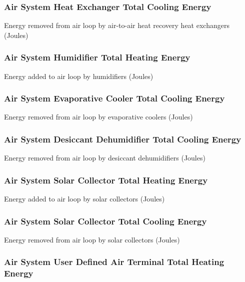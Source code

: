\subsubsection{Air System Heat Exchanger Total Cooling Energy}\label{air-system-heat-exchanger-total-cooling-energy}

Energy removed from air loop by air-to-air heat recovery heat exchangers (Joules)

\subsubsection{Air System Humidifier Total Heating Energy}\label{air-system-humidifier-total-heating-energy}

Energy added to air loop by humidifiers (Joules)

\subsubsection{Air System Evaporative Cooler Total Cooling Energy}\label{air-system-evaporative-cooler-total-cooling-energy}

Energy removed from air loop by evaporative coolers (Joules)

\subsubsection{Air System Desiccant Dehumidifier Total Cooling Energy}\label{air-system-desiccant-dehumidifier-total-cooling-energy}

Energy removed from air loop by desiccant dehumidifiers (Joules)

\subsubsection{Air System Solar Collector Total Heating Energy}\label{air-system-solar-collector-total-heating-energy}

Energy added to air loop by solar collectors (Joules)

\subsubsection{Air System Solar Collector Total Cooling Energy}\label{air-system-solar-collector-total-cooling-energy}

Energy removed from air loop by solar collectors (Joules)

\subsubsection{Air System User Defined Air Terminal Total Heating Energy}\label{air-system-user-defined-air-terminal-total-heating-energy}

